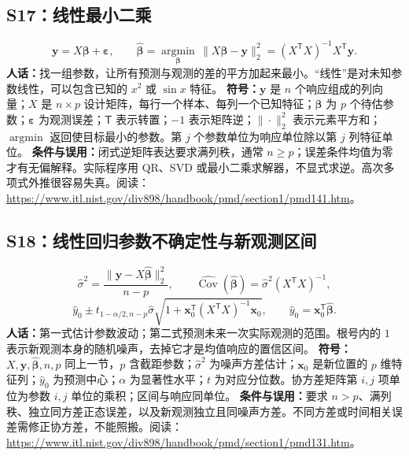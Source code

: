 \subsection{S17：线性最小二乘}
\begin{equation}
 \mathbf y=X\boldsymbol\beta+\boldsymbol\varepsilon,\qquad
 \hat{\boldsymbol\beta}=\underset{\boldsymbol\beta}{\operatorname{argmin}}\,
 \|X\boldsymbol\beta-\mathbf y\|_2^2
 =(X^{\mathsf T}X)^{-1}X^{\mathsf T}\mathbf y.
\end{equation}
\textbf{人话：}找一组参数，让所有预测与观测的差的平方加起来最小。“线性”是对未知参数线性，可以包含已知的 $x^2$ 或 $\sin x$ 特征。
\textbf{符号：}$\mathbf y$ 是 $n$ 个响应组成的列向量；$X$ 是 $n\times p$ 设计矩阵，每行一个样本、每列一个已知特征；$\boldsymbol\beta$ 为 $p$ 个待估参数；$\boldsymbol\varepsilon$ 为观测误差；$\mathsf T$ 表示转置；$-1$ 表示矩阵逆；$\|\cdot\|_2^2$ 表示元素平方和；$\operatorname{argmin}$ 返回使目标最小的参数。第 $j$ 个参数单位为响应单位除以第 $j$ 列特征单位。
\textbf{条件与误用：}闭式逆矩阵表达要求满列秩，通常 $n\ge p$；误差条件均值为零才有无偏解释。实际程序用 QR、SVD 或最小二乘求解器，不显式求逆。高次多项式外推很容易失真。阅读：\url{https://www.itl.nist.gov/div898/handbook/pmd/section1/pmd141.htm}。

\subsection{S18：线性回归参数不确定性与新观测区间}
\begin{equation}
 \hat\sigma^2=\frac{\|\mathbf y-X\hat{\boldsymbol\beta}\|_2^2}{n-p},\qquad
 \widehat{\operatorname{Cov}}(\hat{\boldsymbol\beta})=\hat\sigma^2(X^{\mathsf T}X)^{-1},
\end{equation}
\begin{equation}
 \hat y_0\pm t_{1-\alpha/2,n-p}\hat\sigma\sqrt{1+\mathbf x_0^{\mathsf T}(X^{\mathsf T}X)^{-1}\mathbf x_0},\qquad
 \hat y_0=\mathbf x_0^{\mathsf T}\hat{\boldsymbol\beta}.
\end{equation}
\textbf{人话：}第一式估计参数波动；第二式预测未来一次实际观测的范围。根号内的 $1$ 表示新观测本身的随机噪声，去掉它才是均值响应的置信区间。
\textbf{符号：}$X,\mathbf y,\hat{\boldsymbol\beta},n,p$ 同上一节，$p$ 含截距参数；$\hat\sigma^2$ 为噪声方差估计；$\mathbf x_0$ 是新位置的 $p$ 维特征列；$\hat y_0$ 为预测中心；$\alpha$ 为显著性水平；$t$ 为对应分位数。协方差矩阵第 $i,j$ 项单位为参数 $i,j$ 单位的乘积；区间与响应同单位。
\textbf{条件与误用：}要求 $n>p$、满列秩、独立同方差正态误差，以及新观测独立且同噪声方差。不同方差或时间相关误差需修正协方差，不能照搬。阅读：\url{https://www.itl.nist.gov/div898/handbook/pmd/section1/pmd131.htm}。

